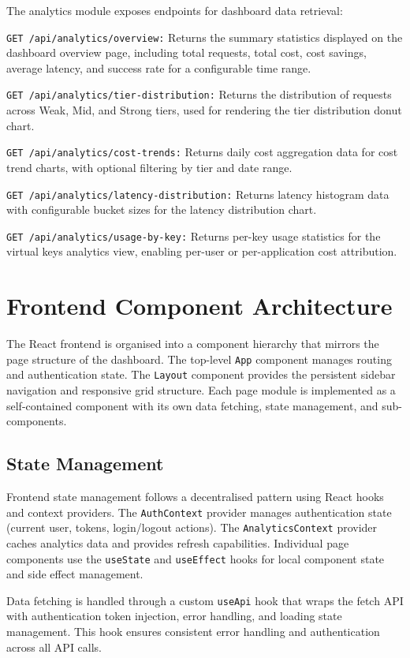 \documentclass[oneside,12pt,a4paper]{report}
\begin{document}
The analytics module exposes endpoints for dashboard data retrieval:

\texttt{GET /api/analytics/overview:} Returns the summary statistics displayed on the dashboard overview page, including total requests, total cost, cost savings, average latency, and success rate for a configurable time range.

\texttt{GET /api/analytics/tier-distribution:} Returns the distribution of requests across Weak, Mid, and Strong tiers, used for rendering the tier distribution donut chart.

\texttt{GET /api/analytics/cost-trends:} Returns daily cost aggregation data for cost trend charts, with optional filtering by tier and date range.

\texttt{GET /api/analytics/latency-distribution:} Returns latency histogram data with configurable bucket sizes for the latency distribution chart.

\texttt{GET /api/analytics/usage-by-key:} Returns per-key usage statistics for the virtual keys analytics view, enabling per-user or per-application cost attribution.

\section{Frontend Component Architecture}

The React frontend is organised into a component hierarchy that mirrors the page structure of the dashboard. The top-level \texttt{App} component manages routing and authentication state. The \texttt{Layout} component provides the persistent sidebar navigation and responsive grid structure. Each page module is implemented as a self-contained component with its own data fetching, state management, and sub-components.

\subsection{State Management}

Frontend state management follows a decentralised pattern using React hooks and context providers. The \texttt{AuthContext} provider manages authentication state (current user, tokens, login/logout actions). The \texttt{AnalyticsContext} provider caches analytics data and provides refresh capabilities. Individual page components use the \texttt{useState} and \texttt{useEffect} hooks for local component state and side effect management.

Data fetching is handled through a custom \texttt{useApi} hook that wraps the fetch API with authentication token injection, error handling, and loading state management. This hook ensures consistent error handling and authentication across all API calls.
\end{document}
